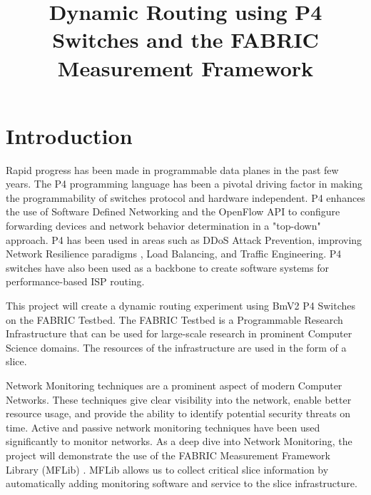 \documentclass[conference]{IEEEtran}
\begin{document}
\title{Dynamic Routing using P4 Switches and the FABRIC Measurement Framework\\}

\author{
\and
{}
}
\maketitle

\begin{abstract}
\end{abstract}

\begin{IEEEkeywords}
\end{IEEEkeywords}

\section{Introduction}
Rapid progress has been made in programmable data planes in the past few years. The P4 programming language \cite{b1} has been a pivotal driving factor in making the programmability of switches protocol and hardware independent. P4 enhances the use of Software Defined Networking and the OpenFlow API to configure forwarding devices and network behavior determination in a "top-down" approach. P4 has been used in areas such as DDoS Attack Prevention, improving Network Resilience paradigms \cite{b2}, Load Balancing, and Traffic Engineering. P4 switches have also been used as a backbone to create software systems for performance-based ISP routing.

This project will create a dynamic routing experiment using BmV2 P4 Switches on the FABRIC Testbed. The FABRIC Testbed is a Programmable Research Infrastructure that can be used for large-scale research in prominent Computer Science domains. The resources of the infrastructure are used in the form of a slice. 

Network Monitoring techniques are a prominent aspect of modern Computer Networks. These techniques give clear visibility into the network, enable better resource usage, and provide the ability to identify potential security threats on time. Active and passive network monitoring techniques have been used significantly to monitor networks. As a deep dive into Network Monitoring, the project will demonstrate the use of the FABRIC Measurement Framework Library (MFLib) \cite{b3}. MFLib allows us to collect critical slice information by automatically adding monitoring software and service to the slice infrastructure. 
\end{document}
